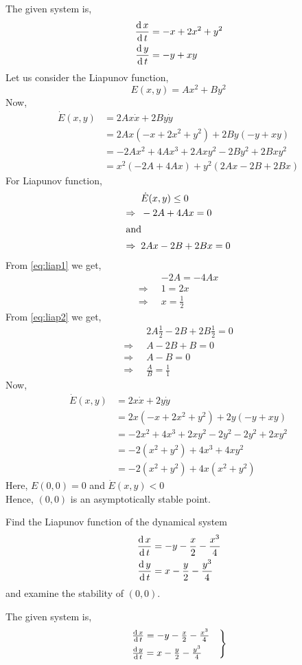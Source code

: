 \documentclass[../main-sheet.tex]{subfiles}
\begin{document}
\begin{soln}
    The given system is,
    \begin{align*}
        \,\frac{\mathrm{d}\,x}{\mathrm{d}\,t}&=-x+2x^2+y^2\\
        \,\frac{\mathrm{d}\,y}{\mathrm{d}\,t}&=-y+xy
    \end{align*}
Let us consider the Liapunov function,
\[E(x,y)=Ax^2+By^2\]
Now,
\begin{align*}
    \dot{E}(x,y)&=2Ax\dot{x}+2By\dot{y}\\
    &=2Ax(-x+2x^2+y^2)+2By(-y+xy)\\
    &=-2Ax^2+4Ax^3+2Axy^2-2By^2+2Bxy^2\\
    &=x^2(-2A+4Ax)+y^2(2Ax-2B+2Bx)
\end{align*}
For Liapunov function,
\begin{align}
    &\dot{E}(x,y)\leq0\notag\\
    \Rightarrow\;\;&-2A+4Ax=0\label{eq:liap1}\\
    \intertext{and}
    \Rightarrow\;\;&2Ax-2B+2Bx=0\label{eq:liap2}
\end{align}
From \eqref{eq:liap1} we get,
\begin{align*}
    &-2A=-4Ax\\
    \Rightarrow\;\;&1=2x\\
    \Rightarrow\;\;&x=\frac{1}{2}
\end{align*}
From \eqref{eq:liap2} we get,
\begin{align*}
    &2A\frac{1}{2}-2B+2B\frac{1}{2}=0\\
    \Rightarrow\;\;&A-2B+B=0\\
    \Rightarrow\;\;&A-B=0\\
    \Rightarrow\;\;&\frac{A}{B}=\frac{1}{1}
\end{align*}
Now, 
\begin{align*}
    \dot{E}(x,y)&=2x\dot{x}+2y\dot{y}\\
    &=2x(-x+2x^2+y^2)+2y(-y+xy)\\
    &=-2x^2+4x^3+2xy^2-2y^2-2y^2+2xy^2\\
    &=-2(x^2+y^2)+4x^3+4xy^2\\
    &=-2(x^2+y^2)+4x(x^2+y^2)
\end{align*}
Here, \(E(0,0)=0\) and \(\dot{E}(x,y)<0\)\\
Hence, \((0,0)\) is an asymptotically stable point.
\end{soln}
\begin{prob}
    Find the Liapunov function of the dynamical system
    \begin{align*}
        \,\frac{\mathrm{d}\,x}{\mathrm{d}\,t}&=-y-\frac{x}{2}-\frac{x^3}{4}\\
        \,\frac{\mathrm{d}\,y}{\mathrm{d}\,t}&=x-\frac{y}{2}-\frac{y^3}{4}
    \end{align*}
    and examine the stability of \((0,0)\).
\end{prob}
\begin{soln}
    The given system is,
    \begin{equation}
        \begin{rcases}
            \,\frac{\mathrm{d}\,x}{\mathrm{d}\,t}=-y-\frac{x}{2}-\frac{x^3}{4}\quad\\
        \,\frac{\mathrm{d}\,y}{\mathrm{d}\,t}=x-\frac{y}{2}-\frac{y^3}{4}
        \end{rcases}
        \label{eq:liapro1}
    \end{equation}
\end{soln}
\end{document}
